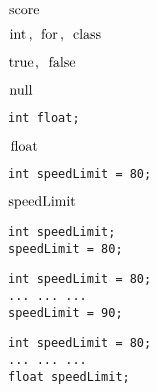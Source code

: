 \documentclass{book}
\def\lthtmlcheckvsize{\ifdim\ht\sizebox<\vsize 
  \ifdim\wd\sizebox<\hsize\expandafter\hfill\fi \expandafter\vfill
  \else\expandafter\vss\fi}%
\begin{document}
{\newpage\clearpage
{}%
$\lstinline{score}$%
\lthtmlindisplaymathZ
\lthtmlcheckvsize\clearpage}

{\newpage\clearpage
{}%
$\lstinline{int, for, class}$%
\lthtmlindisplaymathZ
\lthtmlcheckvsize\clearpage}

{\newpage\clearpage
{}%
$\lstinline{true, false}$%
\lthtmlindisplaymathZ
\lthtmlcheckvsize\clearpage}

{\newpage\clearpage
{}%
$\lstinline{null}$%
\lthtmlindisplaymathZ
\lthtmlcheckvsize\clearpage}

{\newpage\clearpage
{}%
\begin{lstlisting}
int float;
\end{lstlisting}%
\lthtmlfigureZ
\lthtmlcheckvsize\clearpage}

{\newpage\clearpage
{}%
$\lstinline{float}$%
\lthtmlindisplaymathZ
\lthtmlcheckvsize\clearpage}

{\newpage\clearpage
{}%
\begin{lstlisting}
int speedLimit = 80;
\end{lstlisting}%
\lthtmlfigureZ
\lthtmlcheckvsize\clearpage}

{\newpage\clearpage
{}%
$\lstinline{speedLimit}$%
\lthtmlindisplaymathZ
\lthtmlcheckvsize\clearpage}

{\newpage\clearpage
{}%
\begin{lstlisting}
int speedLimit;
speedLimit = 80;
\end{lstlisting}%
\lthtmlfigureZ
\lthtmlcheckvsize\clearpage}

{\newpage\clearpage
{}%
\begin{lstlisting}
int speedLimit = 80;
... ... ...
speedLimit = 90; 
\end{lstlisting}%
\lthtmlfigureZ
\lthtmlcheckvsize\clearpage}

{\newpage\clearpage
{}%
\begin{lstlisting}
int speedLimit = 80;
... ... ...
float speedLimit;
\end{lstlisting}%
\lthtmlfigureZ
\lthtmlcheckvsize\clearpage}
\end{document}
